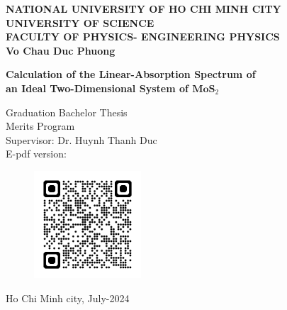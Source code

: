 \documentclass[12pt,english,a4paper]{article}
\begin{document}
	\begin{titlepage}
		\begin{center}
			{\large \textbf{NATIONAL UNIVERSITY OF HO CHI MINH CITY}\\\textbf{UNIVERSITY OF SCIENCE}\\}
			{ \textbf{FACULTY OF PHYSICS- ENGINEERING PHYSICS}}\\[2cm]
			
			
			{ \Large \bfseries Vo Chau Duc Phuong\\[2cm] } 
			
			
			{ \Large \bfseries Calculation of the Linear-Absorption Spectrum of\\ an Ideal Two-Dimensional System of $\mathrm{\textbf{MoS}}_2$\\[3cm]} 
			
			
			\large Graduation Bachelor Thesis\\
			\large Merits Program\\[2cm]
			
			Supervisor: Dr. Huynh Thanh Duc\\[1cm]

			E-pdf version:
			\begin{figure}[h]
				\centering
				\includegraphics[width=4cm]{images/qrgithub.png}
			\end{figure}\null
			\vfill
			Ho Chi Minh city, July-2024
		\end{center}
	\end{titlepage}
%			
\end{document}
